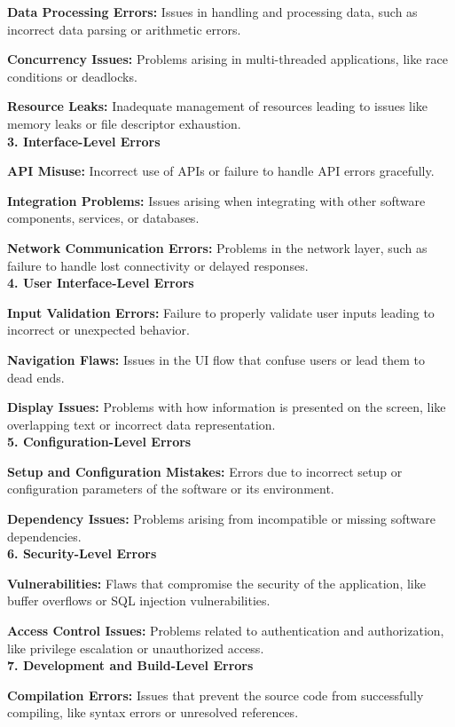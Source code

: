 \documentclass[12pt]{article}
\numberwithin{table}{section}
\begin{document}
\textbf{Data Processing Errors:} Issues in handling and processing data, such as incorrect data parsing or arithmetic errors.

\textbf{Concurrency Issues:} Problems arising in multi-threaded applications, like race conditions or deadlocks.

\textbf{Resource Leaks:} Inadequate management of resources leading to issues like memory leaks or file descriptor exhaustion.
\\
\textbf{3. Interface-Level Errors}

\textbf{API Misuse:} Incorrect use of APIs or failure to handle API errors gracefully.

\textbf{Integration Problems:} Issues arising when integrating with other software components, services, or databases.

\textbf{Network Communication Errors:} Problems in the network layer, such as failure to handle lost connectivity or delayed responses.
\\
\textbf{4. User Interface-Level Errors}

\textbf{Input Validation Errors: } Failure to properly validate user inputs leading to incorrect or unexpected behavior.

\textbf{Navigation Flaws:} Issues in the UI flow that confuse users or lead them to dead ends.

\textbf{Display Issues:} Problems with how information is presented on the screen, like overlapping text or incorrect data representation.
\\
\textbf{5. Configuration-Level Errors}

\textbf{Setup and Configuration Mistakes:} Errors due to incorrect setup or configuration parameters of the software or its environment.

\textbf{Dependency Issues:} Problems arising from incompatible or missing software dependencies.
\\
\textbf{6. Security-Level Errors}

\textbf{Vulnerabilities:} Flaws that compromise the security of the application, like buffer overflows or SQL injection vulnerabilities.

\textbf{Access Control Issues:} Problems related to authentication and authorization, like privilege escalation or unauthorized access.
\\
\textbf{7. Development and Build-Level Errors}

\textbf{Compilation Errors:} Issues that prevent the source code from successfully compiling, like syntax errors or unresolved references.
\end{document}

